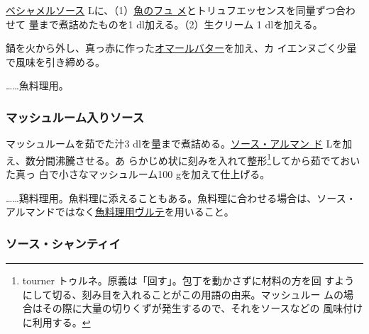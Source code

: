\begin{recette}
\protect\hyperlink{sauce-bechamel}{ベシャメルソース}\troisquarts{}
Lに、（1）\protect\hyperlink{fumet-de-poisson}{魚のフュ
メ}とトリュフエッセンスを同量ずつ合わせて
\troisquarts{}量まで煮詰めたものを1\undemi{} dl加える。（2）生クリーム
1\undemi{} dlを加える。

鍋を火から外し、真っ赤に作った\protect\hyperlink{beurre-de-homard}{オマールバター}を加え、カ
イエンヌごく少量で風味を引き締める。

\ldots{}\ldots{}魚料理用。

\maeaki

\hypertarget{sauce-aux-champignons-blanche}{%
\subsubsection{マッシュルーム入りソース}\label{sauce-aux-champignons-blanche}}



マッシュルームを茹でた汁3
dlを\untiers{}量まで煮詰める。\protect\hyperlink{sauce-allemande}{ソース・アルマン
ド}\troisquarts{} Lを加え、数分間沸騰させる。あ
らかじめ状に刻みを入れて整形\footnote{tourner
  トゥルネ。原義は「回す」。包丁を動かさずに材料の方を回
  すようにして切る、刻み目を入れることがこの用語の由来。マッシュルー
  ムの場合はその際に大量の切りくずが発生するので、それをソースなどの
  風味付けに利用する。}してから茹でておいた真っ
白で小さなマッシュルーム100 gを加えて仕上げる。

\ldots{}\ldots{}鶏料理用。魚料理に添えることもある。魚料理に合わせる場合は、ソース・
アルマンドではなく\protect\hyperlink{veloute-de-poisson}{魚料理用ヴルテ}を用いること。

\maeaki

\hypertarget{sauce-chantilly}{%
\subsubsection{ソース・シャンティイ}\label{sauce-chantilly}}


\end{recette}
